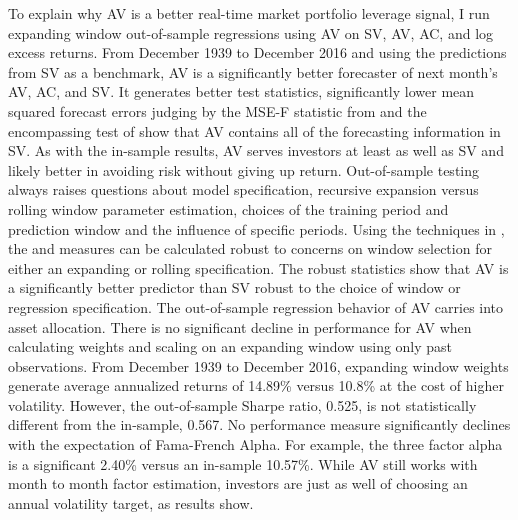 To explain why AV is a better real-time market portfolio leverage signal, I run expanding window out-of-sample regressions using AV on SV, AV, AC, and log excess returns. From December 1939 to December 2016 and using the predictions from SV as a benchmark, AV is a significantly better forecaster of next month’s AV, AC, and SV. It generates better \citet{Diebold1995} test statistics, significantly lower mean squared forecast errors judging by the MSE-F statistic from \citet{mccracken_asymptotics_2007} and the encompassing test of \citet{harvey_tests_1998} show that AV contains all of the forecasting information in SV. As with the in-sample results, AV serves investors at least as well as SV and likely better in avoiding risk without giving up return. Out-of-sample testing always raises questions about model specification, recursive expansion versus rolling window parameter estimation, choices of the training period and prediction window and the influence of specific periods. Using the techniques in \citet{rossi_out--sample_2012}, the \citet{Diebold1995} and \citet{harvey_tests_1998} measures can be calculated robust to concerns on window selection for either an expanding or rolling specification.
The \citet{rossi_out--sample_2012}  robust statistics show that AV is a significantly better predictor than SV robust to the choice of window or regression specification. %
The out-of-sample regression behavior of AV carries into asset allocation. There is no significant decline in performance for AV when calculating weights and scaling on an expanding window using only past observations. From December 1939 to December 2016, expanding window weights generate average annualized returns of 14.89\% versus 10.8\% at the cost of higher volatility. However, the out-of-sample Sharpe ratio, 0.525, is not statistically different from the in-sample, 0.567. No performance measure significantly declines with the expectation of Fama-French Alpha. For example, the three factor alpha is a significant 2.40\% versus an in-sample 10.57\%. While AV still works with month to month factor estimation, investors are just as well of choosing an annual volatility target, as results show.

